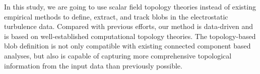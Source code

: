 In this study, we are going to use scalar field topology theories instead of existing empirical methods to define, extract, and track blobs in the electrostatic turbulence data.  Compared with previous efforts, our method is data-driven and is based on well-established computational topology theories.  The topology-based blob definition is not only compatible with existing connected component based analyses, but also is capable of capturing more comprehensive topological information from the input data than previously possible.  




